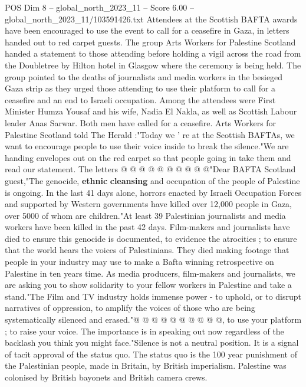 \begin{textsample}{POS Dim 8 – global\_north\_2023\_11 – Score 6.00 – global\_north\_2023\_11/103591426.txt}  \label{ex:f8_pos_181}
Attendees at the Scottish BAFTA awards have been encouraged to use the event to call for a ceasefire in Gaza, in letters handed out to red carpet guests.
The group Arts Workers for Palestine Scotland handed a statement to those attending before holding a vigil across the road from the Doubletree by Hilton hotel in Glasgow where the ceremony is being held.
The group pointed to the deaths of journalists and media workers in the besieged Gaza strip as they urged those attending to use their platform to call for a ceasefire and an end to Israeli occupation.
Among the attendees were First Minister Humza Yousaf and his wife, Nadia El Nakla, as well as Scottish Labour leader Anas Sarwar.
Both men have called for a ceasefire.
Arts Workers for Palestine Scotland told The Herald :"Today we ' re at the Scottish BAFTAs, we want to encourage people to use their voice inside to break the silence."We are handing envelopes out on the red carpet so that people going in take them and read our statement.
The letters @ @ @ @ @ @ @ @ @ @"Dear BAFTA Scotland guest,"The genocide, \textbf{ethnic} \textbf{cleansing} and occupation of the people of Palestine is ongoing.
In the last 41 days alone, horrors enacted by Israeli Occupation Forces and supported by Western governments have killed over 12,000 people in Gaza, over 5000 of whom are children."At least 39 Palestinian journalists and media workers have been killed in the past 42 days.
Film-makers and journalists have died to ensure this genocide is documented, to evidence the atrocities ; to ensure that the world hears the voices of Palestinians.
They died making footage that people in your industry may use to make a Bafta winning retrospective on Palestine in ten years time.
As media producers, film-makers and journalists, we are asking you to show solidarity to your fellow workers in Palestine and take a stand."The Film and TV industry holds immense power - to uphold, or to disrupt narratives of oppression, to amplify the voices of those who are being systematically silenced and erased."@ @ @ @ @ @ @ @ @ @, to use your platform ; to raise your voice.
The importance is in speaking out now regardless of the backlash you think you might face."Silence is not a neutral position.
It is a signal of tacit approval of the status quo.
The status quo is the 100 year punishment of the Palestinian people, made in Britain, by British imperialism.
Palestine was colonised by British bayonets and British camera crews.

\end{textsample}
